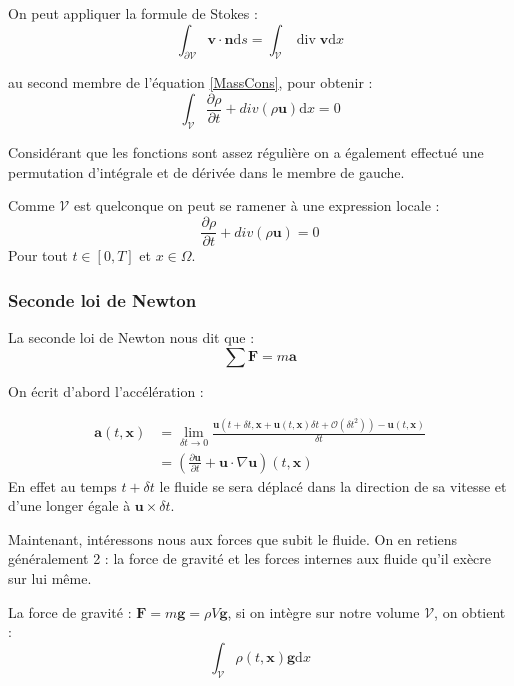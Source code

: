 On peut appliquer la formule de Stokes : 
\begin{equation}\label{StokesFormula}
\int_{\partial \mathcal{V}} \mathbf{v} \cdot \mathbf{n} \mathrm{d} s=\int_{\mathcal{V}} \operatorname{div} \mathbf{v} \mathrm{d} x
\end{equation}

au second membre de l'équation \ref{MassCons}, pour obtenir : 
\begin{equation}
\int_{\mathcal{V}} \frac{\partial\rho}{\partial t} + div(\rho \mathbf{u}) \mathrm{d} x = 0
\end{equation}

Considérant que les fonctions sont assez régulière on a également effectué une permutation d'intégrale et de dérivée dans le membre de gauche.

Comme $\mathcal{V}$ est quelconque on peut se ramener à une expression locale : 
\begin{equation}\label{MassConsLoc}
\frac{\partial\rho}{\partial t} + div(\rho \mathbf{u})  = 0 
\end{equation}
Pour tout $t \in [0, T] $ et $x \in \Omega$.

\subsubsection{Seconde loi de Newton}
La seconde loi de Newton nous dit que :
\[\sum \mathbf{F} = m \mathbf{a}\]

On écrit d'abord l'accélération :

\begin{equation}
\begin{aligned}
\mathbf{a}(t, \mathbf{x}) &=\lim _{\delta t \rightarrow 0} \frac{\mathbf{u}\left(t+\delta t, \mathbf{x}+\mathbf{u}(t, \mathbf{x}) \delta t+\mathcal{O}\left(\delta t^{2}\right)\right)-\mathbf{u}(t, \mathbf{x})}{\delta t} \\
&=\left(\frac{\partial \mathbf{u}}{\partial t}+\mathbf{u} \cdot \nabla \mathbf{u}\right)(t, \mathbf{x})
\end{aligned}
\end{equation}
En effet au temps $t + \delta t$ le fluide se sera déplacé dans la direction de sa vitesse et d'une longer égale à $\mathbf{u}\times \delta t$.


Maintenant, intéressons nous aux forces que subit le fluide. 
On en retiens généralement 2 : la force de gravité et les forces internes aux fluide qu'il exècre sur lui même.

La force de gravité : $\mathbf{F} = m \mathbf{g} = \rho V \mathbf{g}$, si on intègre sur notre volume $\mathcal{V}$, on obtient : 
\begin{equation}
\int_{\mathcal{V}} \rho(t, \mathbf{x}) \mathbf{g} \mathrm{d} x
\end{equation}

